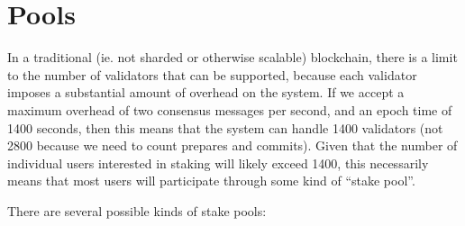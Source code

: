 \documentclass[12pt, final]{article}
\begin{document}
\section{Pools}

In a traditional (ie. not sharded or otherwise scalable) blockchain, there is a limit to the number of validators that can be supported, because each validator imposes a substantial amount of overhead on the system. If we accept a maximum overhead of two consensus messages per second, and an epoch time of 1400 seconds, then this means that the system can handle 1400 validators (not 2800 because we need to count prepares and commits). Given that the number of individual users interested in staking will likely exceed 1400, this necessarily means that most users will participate through some kind of ``stake pool''.

There are several possible kinds of stake pools:
\end{document}
